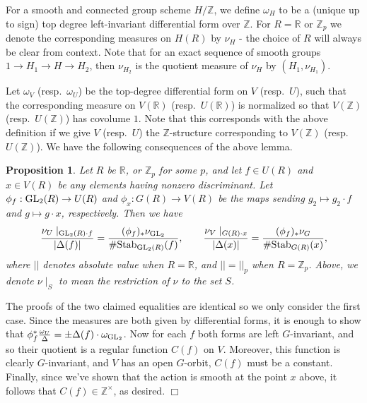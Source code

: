 \documentclass{article}
\def\Z{{\mathbb Z}}
\def\GL{{\rm GL}}
\def\Stab{{\rm Stab}}
\def\R{{\mathbb R}}
\def\Z{{\mathbb Z}}
\newtheorem{proposition}[theorem]{Proposition}
\newenvironment{proof}{\noindent {\bf Proof:}}{$\Box$ \vspace{2 ex}}
\begin{document}
For a smooth and connected group scheme $H/\Z$, we define $\omega_H$ to be a (unique up to sign) top degree left-invariant differential form over $\Z$. For $R=\R$ or $\Z_p$ we denote the corresponding measures on $H(R)$ by $\nu_H$ - the choice of $R$ will always be clear from context. Note that for an exact sequence of smooth groups $1\to H_1\to H\to H_2$, then $\nu_{H_2}$ is the quotient measure of $\nu_H$ by $(H_1,\nu_{H_1})$.



Let $\omega_V$ (resp.\ $\omega_U$) be the top-degree differential form on $V$ (resp.\ $U$), such that the corresponding measure on $V(\R)$ (resp.\ $U(\R)$) is normalized so that $V(\Z)$ (resp.\ $U(\Z)$) has covolume $1$. Note that this corresponds with the above definition if we give $V$ (resp.\ $U$) the $\Z$-structure corresponding to $V(\Z)$ (resp.\ $U(\Z)$). 
We have the following consequences of the above lemma.

\begin{proposition}\label{prop:first_change_of_measures}
Let $R$ be $\R$, or $\Z_p$ for some $p$, and let $f\in U(R)$ and $x\in V(R)$ be any elements having nonzero discriminant. Let $\phi_f:\GL_2(R)\to U(R)$ and $\phi_x:G(R)\to V(R)$ be the maps sending $g_2\mapsto g_2\cdot f$ and $g\mapsto g\cdot x$, respectively. Then we have 
\begin{equation*}
\frac{\nu_U\mid_{\GL_2(R)\cdot f}}{|\Delta(f)|}=\frac{(\phi_f)_*\nu_{\GL_2}}{\#\Stab_{\GL_2(R)}(f)} ,
\quad\quad
\frac{\nu_V\mid_{G(R)\cdot x}}{|\Delta(x)|}=\frac{(\phi_f)_*\nu_{G}}{\#\Stab_{G(R)}(x)},
\end{equation*}
where $||$ denotes absolute value when $R=\R$, and $||=||_p$ when $R=\Z_p$. Above, we denote $\nu\mid_{S}$ to mean the restriction of $\nu$ to the set $S$.
\end{proposition}
\begin{proof}
The proofs of the two claimed equalities are identical so we only consider the first case. Since the measures are both given by differential forms, it is enough to show that $\phi_f^*\frac{\omega_U}{\Delta} =\pm\Delta(f)\cdot\omega_{\GL_2}$. Now for each $f$ both forms are left $G$-invariant, and so their quotient is a regular function $C(f)$ on $V$. Moreover, this function is clearly $G$-invariant, and $V$ has an open $G$-orbit, $C(f)$ must be a constant. Finally, since we've shown that the action is smooth at the point $x$ above, it follows that $C(f)\in\Z^{\times}$, as desired.
\end{proof}
\end{document}

